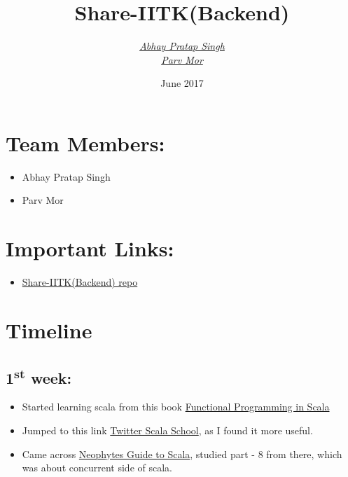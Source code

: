\documentclass{article}
\title{Share-IITK(Backend)}
\author{\href{mailto:abhays@iitk.ac.in}{\textit{Abhay Pratap Singh}}
        \\
        \href{mailto:parv@iitk.ac.in}{\textit{Parv Mor}}}
\date{June 2017}
\begin{document}
\maketitle
\section*{Team Members:}
\begin{itemize}
    \item Abhay Pratap Singh
    \item Parv Mor
\end{itemize}
\section*{Important Links:}
\begin{itemize}
    \item \href{https://github.com/abhayptp/share-iitk}{Share-IITK(Backend) repo}
\end{itemize}
\section*{\textbf{Timeline}}
\subsection*{1\textsuperscript{st} week:}
\begin{itemize}
     \item Started learning scala from this book \href{https://www.manning.com/books/functional-programming-in-scala}{Functional Programming in Scala}
    \item Jumped to this link \href{https://twitter.github.io/scala_school/}{Twitter Scala School}, as I found it more useful.
    \item Came across \href{http://danielwestheide.com/scala/neophytes.html}{Neophytes Guide to Scala}, studied part - 8 from there, which was about concurrent side of scala.
\end{itemize}
\end{document}
